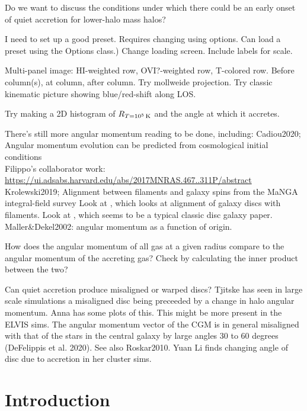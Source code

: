 \documentclass[fleqn,usenatbib]{mnras}
\newcommand{\Rcon}{R_{T=10^5\,{\rm K}}}
\begin{document}
Do we want to discuss the conditions under which there could be an early onset of quiet accretion for lower-halo mass halos?

I need to set up a good preset. Requires changing using options. Can load a preset using the Options class.)
Change loading screen.
Include labels for scale.

Multi-panel image:
HI-weighted row,
OVI?-weighted row,
T-colored row.
Before column(s), at column, after column.
Try mollweide projection.
Try classic kinematic picture showing blue/red-shift along LOS.

Try making a 2D histogram of $\Rcon$ and the angle at which it accretes.

There's still more angular momentum reading to be done, including:
Cadiou2020; Angular momentum evolution can be predicted from cosmological initial conditions\\
Filippo's collaborator work: \url{https://ui.adsabs.harvard.edu/abs/2017MNRAS.467..311P/abstract}\\
Krolewski2019; Alignment between filaments and galaxy spins from the {MaNGA} integral-field survey
Look at \cite{Bird2019}, which looks at alignment of galaxy discs with filaments.
Look at \cite{Bird2020}, which seems to be a typical classic disc galaxy paper.
Maller\&Dekel2002: angular momentum as a function of origin.

How does the angular momentum of all gas at a given radius compare to the angular momentum of the accreting gas?
Check by calculating the inner product between the two?

Can quiet accretion produce misaligned or warped discs?
Tjitske has seen in large scale simulations a misaligned disc being preceeded by a change in halo angular momentum.
Anna has some plots of this. This might be more present in the ELVIS sims.
The angular momentum vector of the CGM is in general misaligned with that of the stars in the central galaxy by large angles  30 to 60 degrees (DeFelippis et al. 2020).
See also Roskar2010.
Yuan Li finds changing angle of disc due to accretion in her cluster sims.

\section{Introduction}
\label{s: introduction}
\end{document}
